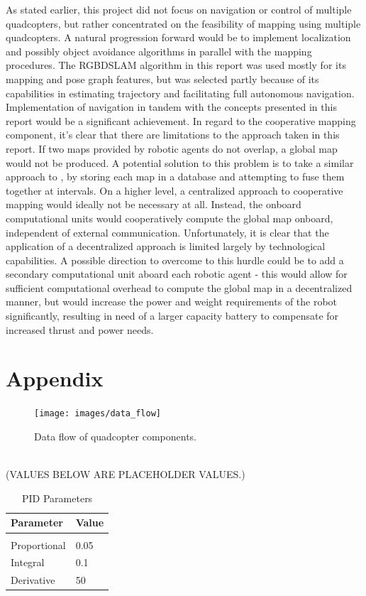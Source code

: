 \documentclass[letterpaper, oneside, 10pt]{report}
\begin{document}
As stated earlier, this project did not focus on navigation or control of multiple quadcopters, but rather concentrated on the feasibility of mapping using multiple quadcopters. A natural progression forward would be to implement localization and possibly object avoidance algorithms in parallel with the mapping procedures. The RGBDSLAM algorithm in this report was used mostly for its mapping and pose graph features, but was selected partly because of its capabilities in estimating trajectory and facilitating full autonomous navigation. Implementation of navigation in tandem with the concepts presented in this report would be a significant achievement. In regard to the cooperative mapping component, it's clear that there are limitations to the approach taken in this report. If two maps provided by robotic agents do not overlap, a global map would not be produced. A potential solution to this problem is to take a similar approach to , by storing each map in a database and attempting to fuse them together at intervals. On a higher level, a centralized approach to cooperative mapping would ideally not be necessary at all. Instead, the onboard computational units would cooperatively compute the global map onboard, independent of external communication. Unfortunately, it is clear that the application of a decentralized approach is limited largely by technological capabilities. A possible direction to overcome to this hurdle could be to add a secondary computational unit aboard each robotic agent - this would allow for sufficient computational overhead to compute the global map in a decentralized manner, but would increase the power and weight requirements of the robot significantly, resulting in need of a larger capacity battery to compensate for increased thrust and power needs.

\chapter{Appendix}

\begin{figure}[h!]
 \caption{Data flow of quadcopter components.}
 \centering
   \texttt{[image: images/data\_flow]}
 \label{fig: data flow.}
\end{figure} \\

(VALUES BELOW ARE PLACEHOLDER VALUES.) \\

\begin{table}[h!]
  \centering
  \caption{PID Parameters}
  \vspace{2mm}
  \begin{tabular}{l l}
    \hline \hline
    \vspace{-2mm}
    Parameter & \multicolumn{1}{l}{Value} \\ [1ex]
    \hline
    & \\
    Proportional & 0.05 \\
    Integral & 0.1 \\
    Derivative & 50 \\
  \end{tabular}
  \label{tbl: pid param.}
\end{table}
\end{document}
